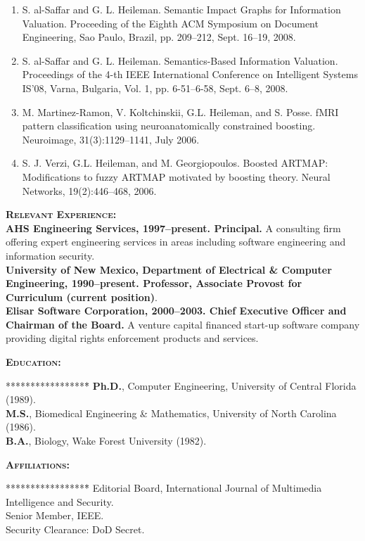 \documentclass{sbir}
\begin{document}
{{\begin{enumerate}
\item S. al-Saffar and G. L. Heileman. Semantic Impact Graphs for Information Valuation. Proceeding of the Eighth ACM Symposium on Document Engineering, Sao Paulo, Brazil, pp. 209--212, Sept. 16--19, 2008.
\item S. al-Saffar and G. L. Heileman. Semantics-Based Information Valuation. Proceedings of the 4-th IEEE International Conference on Intelligent Systems IS'08, Varna, Bulgaria, Vol. 1, pp. 6-51--6-58, Sept. 6--8, 2008.
\item M. Martinez-Ramon, V. Koltchinskii, G.L. Heileman, and S. Posse. fMRI pattern classification using neuroanatomically constrained boosting. Neuroimage, 31(3):1129--1141, July 2006.
\item S. J. Verzi, G.L. Heileman, and M. Georgiopoulos. Boosted {ARTMAP}: Modifications to fuzzy ARTMAP motivated by boosting theory. Neural Networks, 19(2):446--468, 2006.
\end{enumerate}
\textbf{\textsc{Relevant Experience:}}~\\
{\bfseries AHS Engineering Services, 1997--present. Principal.} A consulting firm offering expert engineering services in areas including software engineering and information security.~\\
{\bfseries University of New Mexico, Department of Electrical \& Computer Engineering, 1990--present. Professor, Associate Provost for Curriculum (current position)}.~\\
{\bfseries Elisar Software Corporation, 2000--2003. Chief Executive Officer and Chairman of the Board.} A venture capital financed start-up software company providing digital rights enforcement products and services.

\textbf{\textsc{Education:}}
\vspace{-30pt}
\begin{tabbing}*****************\=\kill
 \> {\bfseries Ph.D.}, Computer Engineering, University of Central Florida (1989). \\
 \> {\bfseries M.S.}, Biomedical Engineering \& Mathematics, University of North Carolina (1986). \\
 \> {\bfseries B.A.}, Biology, Wake Forest University (1982).
\end{tabbing}

\textbf{\textsc{Affiliations:}}
\vspace{-30pt}
\begin{tabbing}*****************\=\kill
\> Editorial Board,  International Journal of Multimedia Intelligence and Security. \\
\> Senior Member, IEEE. \\
\> Security Clearance: DoD Secret.
\end{tabbing}

}}
\end{document}
